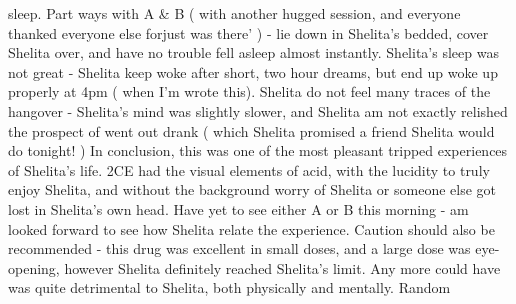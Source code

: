 \documentclass[12pt]{book}
\begin{document}
sleep. Part ways with A \& B ( with another hugged session, and everyone thanked everyone else forjust was there' ) - lie down in Shelita's bedded, cover Shelita over, and have no trouble fell asleep almost instantly. Shelita's sleep was not great - Shelita keep woke after short, two hour dreams, but end up woke up properly at 4pm ( when I'm wrote this). Shelita do not feel many traces of the hangover - Shelita's mind was slightly slower, and Shelita am not exactly relished the prospect of went out drank ( which Shelita promised a friend Shelita would do tonight! ) In conclusion, this was one of the most pleasant tripped experiences of Shelita's life. 2CE had the visual elements of acid, with the lucidity to truly enjoy Shelita, and without the background worry of Shelita or someone else got lost in Shelita's own head. Have yet to see either A or B this morning - am looked forward to see how Shelita relate the experience. Caution should also be recommended - this drug was excellent in small doses, and a large dose was eye-opening, however Shelita definitely reached Shelita's limit. Any more could have was quite detrimental to Shelita, both physically and mentally. Random
\end{document}
